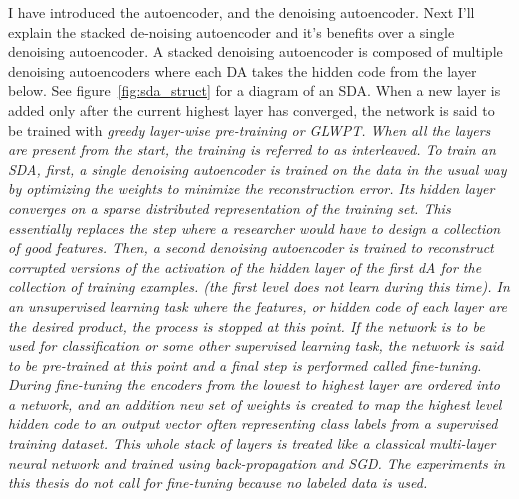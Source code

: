 \documentclass[12pt]{article}
\begin{document}
\begin{doublespacing}
I have introduced the autoencoder, and the denoising autoencoder. Next I'll explain the stacked de-noising autoencoder and it's benefits over a single denoising autoencoder. A stacked denoising autoencoder is composed of multiple denoising autoencoders where each DA takes the hidden code from the layer below. See figure~\ref{fig:sda_struct} for a diagram of an SDA. When a new layer is added only after the current highest layer has converged, the network is said to be trained with \em greedy layer-wise pre-training \em or GLWPT. When all the layers are present from the start, the training is referred to as interleaved. To train an SDA, first, a single denoising autoencoder is trained on the data in the usual way by optimizing the weights to minimize the reconstruction error. Its hidden layer converges on a sparse distributed representation of the training set. This essentially replaces the step where a researcher would have to design a collection of good features. Then, a second denoising autoencoder is trained to reconstruct corrupted versions of the activation of the hidden layer of the first dA for the collection of training examples. (the first level does not learn during this time). In an unsupervised learning task where the features, or hidden code of each layer are the desired product, the process is stopped at this point. If the network is to be used for classification or some other supervised learning task, the network is said to be pre-trained at this point and a final step is performed called fine-tuning. During fine-tuning the encoders from the lowest to highest layer are ordered into a network, and an addition new set of weights is created to map the highest level hidden code to an output vector often representing class labels from a supervised training dataset. This whole stack of layers is treated like a classical multi-layer neural network and trained using back-propagation and SGD. The experiments in this thesis do not call for fine-tuning because no labeled data is used.



\end{doublespacing}
\end{document}
